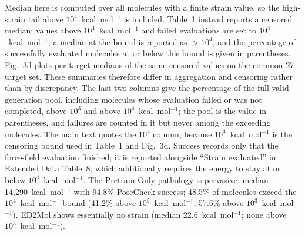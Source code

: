 Median here is computed over all molecules with a finite strain value, so the high-strain tail above $10^{4}$~kcal~mol$^{-1}$ is included. Table~1 instead reports a censored median: values above $10^{4}$~kcal~mol$^{-1}$ and failed evaluations are set to $10^{4}$~kcal~mol$^{-1}$, a median at the bound is reported as $>10^{4}$, and the percentage of successfully evaluated molecules at or below this bound is given in parentheses. Fig.~3d plots per-target medians of the same censored values on the common 27-target set. These summaries therefore differ in aggregation and censoring rather than by discrepancy. The last two columns give the percentage of the full valid-generation pool, including molecules whose evaluation failed or was not completed, above $10^{3}$ and above $10^{4}$~kcal~mol$^{-1}$; the pool is the value in parentheses, and failures are counted in it but never among the exceeding molecules. The main text quotes the $10^{4}$ column, because $10^{4}$~kcal~mol$^{-1}$ is the censoring bound used in Table~1 and Fig.~3d. Success records only that the force-field evaluation finished; it is reported alongside ``Strain evaluated'' in Extended Data Table~8, which additionally requires the energy to stay at or below $10^{4}$~kcal~mol$^{-1}$.
The Pretrain-Only pathology is pervasive: median 14,290~kcal~mol$^{-1}$ with 94.8\% PoseCheck success; 48.5\% of molecules exceed the $10^{4}$~kcal~mol$^{-1}$ bound (41.2\% above $10^{5}$~kcal~mol$^{-1}$; 57.6\% above $10^{3}$~kcal~mol$^{-1}$). ED2Mol shows essentially no strain (median 22.6~kcal~mol$^{-1}$; none above $10^{3}$~kcal~mol$^{-1}$).

